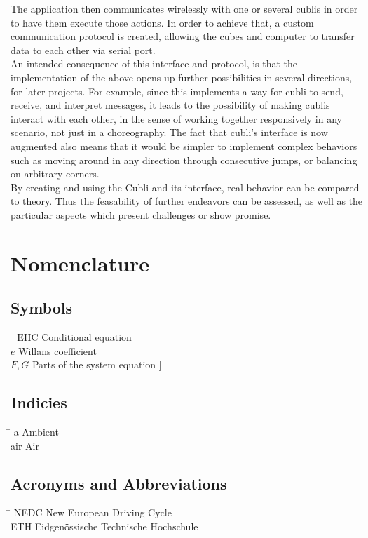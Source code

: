 The application then communicates wirelessly with one or several cublis in order to have them execute those actions. In order to achieve that, a custom communication protocol is created, allowing the cubes and computer to transfer data to each other via serial port.\\ 

An intended consequence of this interface and protocol, is that the implementation of the above opens up further possibilities in several directions, for later projects. 
For example, since this implements a way for cubli to send, receive, and interpret messages, it leads to the possibility of making cublis interact with each other, in the sense of working together responsively in any scenario, not just in a choreography.
The fact that cubli's interface is now augmented also means that it would be simpler to implement complex behaviors such as moving around in any direction through consecutive jumps, or balancing on arbitrary corners.\\

By creating and using the Cubli and its interface, real behavior can be compared to theory. Thus the feasability of further endeavors can be assessed, as well as the particular aspects which present challenges or show promise.

 \cleardoublepage


\chapter*{Nomenclature}\label{chap:symbole}

\section*{Symbols}
\begin{tabbing}
 \hspace*{1.6cm} \= \hspace*{8cm} \= \kill
 $\mathrm{EHC}$ \> Conditional equation \> [$-$] \\[0.5ex]
 $e$ \> Willans coefficient \> [$-$] \\[0.5ex]
 $F,G$ \> Parts of the system equation \> [\unitfrac[]{K}{s}]
\end{tabbing}

\section*{Indicies}
\begin{tabbing}
 \hspace*{1.6cm}  \= \kill
 a \> Ambient \\[0.5ex]
 air \> Air
\end{tabbing}

\section*{Acronyms and Abbreviations}
\begin{tabbing}
 \hspace*{1.6cm}  \= \kill
 NEDC \> New European Driving Cycle \\[0.5ex]
 ETH \> Eidgen\"{o}ssische Technische Hochschule
\end{tabbing}

 \cleardoublepage

